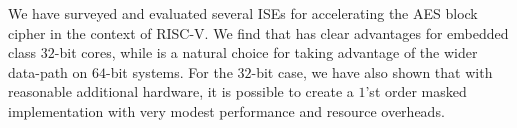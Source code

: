 
We have surveyed and evaluated several ISEs for accelerating
the AES block cipher in the context of RISC-V.
We find that  has clear advantages for embedded class
$32$-bit cores, while  is a natural choice for taking
advantage of the wider data-path on $64$-bit systems.
For the $32$-bit case, we have also shown that with reasonable additional
hardware, it is possible to create a $1$'st order masked implementation with
very modest performance and resource overheads.

